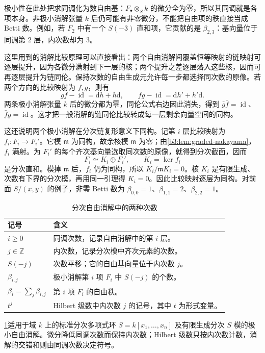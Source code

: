 \ProseParagraphBreak
极小性在此处把求同调化为数自由基：\(F_\bullet\otimes_Sk\) 的微分全为零，所以其同调就是各项本身。非极小消解张量 \(k\) 后仍可能有非零微分，不能把自由项的秩直接当成 Betti 数。例如，若 \(F_2\) 中有一个 \(S(-3)\) 直和项，它贡献的是 \(\beta_{2,3}\)：基向量位于同调第 \(2\) 层，内次数却为 \(3\)。

\ProseParagraphBreak
这里用到的消解比较原理可以直接看出：两个自由消解间覆盖恒等映射的链映射可逐层提升，因为各微分满射到下一层的核；两个提升之差逐层落入这些核，因而可再逐层提升为链同伦。保持次数的自由生成元允许每一步都选择同次数的原像。若两个方向的比较映射为 \(f,g\)，则有
\[
	gf-\operatorname{id}=\mathrm{d}h+h\mathrm{d}, \qquad fg-\operatorname{id}=\mathrm{d}h'+h'\mathrm{d}.
\]
两条极小消解张量 \(k\) 后的微分都为零，同伦公式右边因此消失，得到 \(\bar g\bar f=\operatorname{id}\)、\(\bar f\bar g=\operatorname{id}\)。这才把一般消解的链同伦比较转成每一层剩余向量空间的同构。

\ProseParagraphBreak
这还说明两个极小消解在分次链复形意义下同构。记第 \(i\) 层比较映射为 \(f_i:F_i\rightarrow F_i'\)。它模 \(\mathfrak m\) 为同构，故余核模 \(\mathfrak m\) 为零；由\cref{b3:lem:graded-nakayama}，\(f_i\) 满射。为 \(F_i'\) 的每个齐次基向量选取同次数的原像，就得到分次截面，因而
\[
	F_i\simeq K_i\oplus F_i',\qquad K_i=\ker f_i
\]
是分次直和。模掉 \(\mathfrak m\) 后，\(f_i\) 仍为同构，所以 \(K_i/\mathfrak mK_i=0\)。核 \(K_i\) 是有限生成、次数有下界的分次模，再用同一引理得 \(K_i=0\)。因此比较映射逐层为同构。对前面 \(S/(x,y)\) 的例子，非零 Betti 数为 \(\beta_{0,0}=1\)、\(\beta_{1,1}=2\)、\(\beta_{2,2}=1\)。

\begin{table}[htbp]
	\centering
	\caption{分次自由消解中的两种次数}
	\label{b3:tab:graded-resolution-degrees}
	\begin{tabularx}{\linewidth}{@{}lX@{}}
		\toprule
		记号 & 含义 \\
		\midrule
		\(i\ge0\) & 同调次数，记录自由消解中的第 \(i\) 层。 \\
		\(j\in\mathbb Z\) & 内次数，记录分次模中齐次元素的次数。 \\
		\(S(-j)\) & 次数平移；它的自由基向量位于内次数 \(j\)。 \\
		\(\beta_{i,j}\) & 极小消解第 \(i\) 项 \(F_i\) 中 \(S(-j)\) 的个数。 \\
		\(\beta_i=\sum_j\beta_{i,j}\) & 第 \(i\) 项 \(F_i\) 的自由秩。 \\
		\(t^j\) & Hilbert 级数中内次数 \(j\) 的记号，其中 \(t\) 为形式变量。 \\
		\bottomrule
	\end{tabularx}
\end{table}

\cref{b3:tab:graded-resolution-degrees}适用于域 \(k\) 上的标准分次多项式环 \(S=k[x_1,\ldots,x_n]\) 及有限生成分次 \(S\) 模的极小自由消解。微分降低同调次数而保持内次数；Hilbert 级数只按内次数计数，消解的交错和则由同调次数决定符号。
